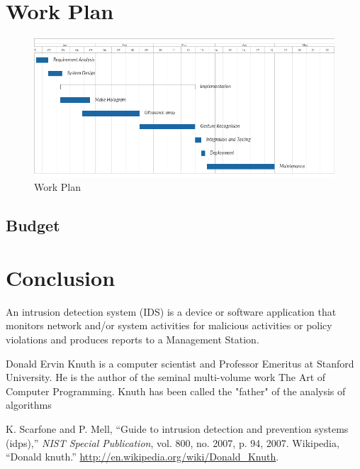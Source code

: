 \documentclass{fisatproject}
\begin{document}
\chapter{Work Plan}
    \begin{figure}[h!]
        \begin{center}
        \includegraphics[scale=.6]{images/work_plan.png}
        \caption{Work Plan}
        \end{center}
        \end{figure}
 \section{Budget}
\chapter{Conclusion}

An intrusion detection system (IDS) \cite{nist} is a device or software application that monitors network and/or system activities for malicious activities or policy violations and produces reports to a Management Station.


Donald Ervin Knuth \cite{knuth} is a computer scientist and Professor Emeritus at Stanford University. He is the author of the seminal multi-volume work The Art of Computer Programming. Knuth has been called the "father" of the analysis of algorithms


\begin{thebibliography}{1}
 K. Scarfone and P. Mell, ``Guide to intrusion detection and prevention systems
(idps),'' \textit{NIST Special Publication}, vol. 800, no. 2007, p. 94, 2007.
 Wikipedia, ``Donald knuth.'' \url{http://en.wikipedia.org/wiki/Donald_Knuth}.


\end{thebibliography}
\end{document}
